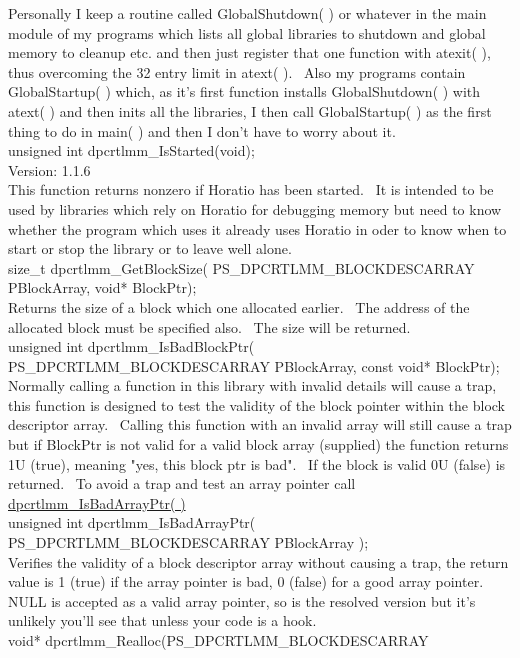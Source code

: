 \documentclass{article}
\begin{document}
Personally
I keep a routine called GlobalShutdown( ) or whatever in the main
module
of my programs which lists all global libraries to shutdown and global
memory to cleanup etc. and then just register that one function with
atexit(
), thus overcoming the 32 entry limit in atext( ).~ Also my
programs
contain GlobalStartup( ) which, as it's first function installs
GlobalShutdown(
) with atext( ) and then inits all the libraries, I then call
GlobalStartup(
) as the first thing to do in main( ) and then I don't have to worry
about
it.
\\
unsigned int dpcrtlmm\_IsStarted(void);
\\
Version: 1.1.6
\\
This function returns nonzero if Horatio has been started.~ It
is intended to be used by libraries which rely on Horatio for
debugging
memory but need to know whether the program which uses it already uses
Horatio in oder to know when to start or stop the library or to leave
well alone.
\\
size\_t dpcrtlmm\_GetBlockSize(
PS\_DPCRTLMM\_BLOCKDESCARRAY
PBlockArray, void* BlockPtr);
\\
Returns the size of a block which one allocated earlier.~ The
address of the allocated block must be specified also.~ The size
will
be returned.
\\
unsigned int dpcrtlmm\_IsBadBlockPtr(
PS\_DPCRTLMM\_BLOCKDESCARRAY
PBlockArray, const void* BlockPtr);
\\
Normally calling a function in this library with invalid details will
cause a trap, this function is designed to test the validity of the
block
pointer within the block descriptor array.~ Calling this function
with an invalid array will still cause a trap but if BlockPtr is not
valid
for a valid block array (supplied) the function returns 1U (true),
meaning
"yes, this block ptr is bad".~ If the block is valid 0U (false) is
returned.~ To avoid a trap and test an array pointer call \href{#IsBadArrayPtr}{dpcrtlmm\_IsBadArrayPtr(
)}
\\
unsigned int dpcrtlmm\_IsBadArrayPtr(
PS\_DPCRTLMM\_BLOCKDESCARRAY
PBlockArray );
\\
Verifies the validity of a block descriptor array without causing a
trap, the return value is 1 (true) if the array pointer is bad, 0
(false)
for a good array pointer.~ NULL is accepted as a valid array
pointer,
so is the resolved version but it's unlikely you'll see that unless
your
code is a hook.
\\
void* dpcrtlmm\_Realloc(PS\_DPCRTLMM\_BLOCKDESCARRAY
\end{document}
